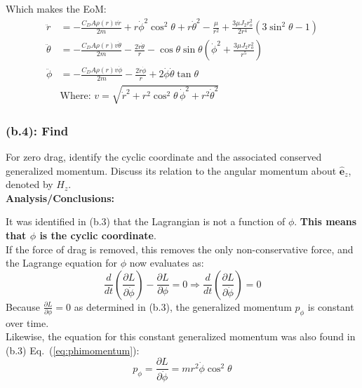 \documentclass[titlepage]{article}
\begin{document}
\begin{mdframed}[linewidth=1pt, innertopmargin=10pt, innerbottommargin=10pt]
	Which makes the EoM:
	\begin{equation}
		\begin{split}
			\ddot{r}&=-\frac{C_DA\rho(r)v\dot{r}}{2m}+r\dot{\phi}^2\cos^2\theta+r\dot{\theta}^2-\frac{\mu}{r^2}+\frac{3\mu J_2r_o^2}{2r^4}\left(3\sin^2\theta-1\right) \\
			\ddot{\theta}&=-\frac{C_DA\rho(r)v\dot{\theta}}{2m}-\frac{2\dot{r}\dot{\theta}}{r}-\cos\theta\sin\theta\left(\dot{\phi}^2+\frac{3\mu J_2r_o^2}{r^5}\right) \\
			\ddot{\phi}&=-\frac{C_DA\rho(r)v\dot{\phi}}{2m}-\frac{2\dot{r}\dot{\phi}}{r}+2\dot{\phi}\dot{\theta}\tan\theta \\
			&\text{Where:  }v=\sqrt{\dot{r}^2+r^2\cos^2\theta\,\dot{\phi}^2+r^2\dot{\theta}^2}
		\end{split}
		\label{eq:eom}
	\end{equation}
\end{mdframed}

\subsubsection*{(b.4): Find}

For zero drag, identify the cyclic coordinate and the associated conserved generalized momentum. Discuss its relation to the angular momentum about $\hat{\boldsymbol{e}}_z$, denoted by $H_z$.\\

\textbf{Analysis/Conclusions:}\\

\begin{mdframed}[linewidth=1pt, innertopmargin=10pt, innerbottommargin=10pt]
	It was identified in (b.3) that the Lagrangian is not a function of $\phi$. \textbf{This means that $\phi$ is the cyclic coordinate}.\\
	
	If the force of drag is removed, this removes the only non-conservative force, and the Lagrange equation for $\phi$ now evaluates as:
	\begin{equation}
		\frac{d}{dt}\left(\frac{\partial L}{\partial\dot{\phi}}\right)-\frac{\partial L}{\partial\phi}=0\Rightarrow\frac{d}{dt}\left(\frac{\partial L}{\partial\dot{\phi}}\right)=0
	\end{equation}
	Because $\frac{\partial L}{\partial\phi}=0$ as determined in (b.3), the generalized momentum $p_\phi$ is constant over time.\\
	
	Likewise, the equation for this constant generalized momentum was also found in (b.3) Eq.~(\ref{eq:phimomentum}):
	\begin{equation}
		p_{\phi}=\frac{\partial L}{\partial\dot{\phi}}=mr^2\dot{\phi}\cos^2\theta
	\end{equation}
\end{mdframed}
\end{document}
